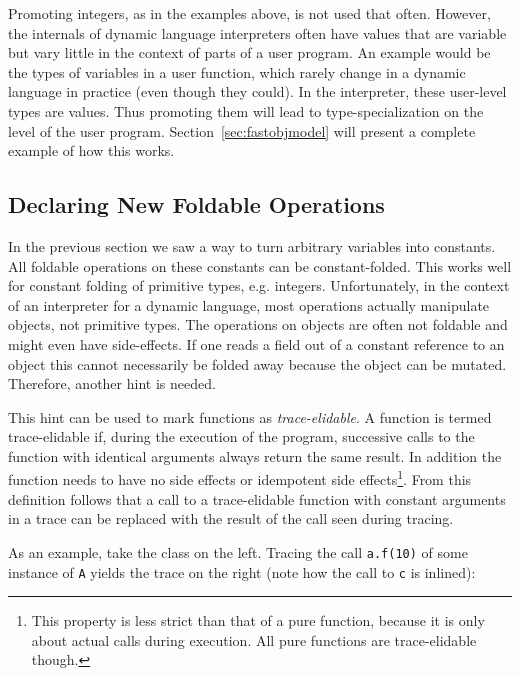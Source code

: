 \documentclass{sigplanconf}
\begin{document}
Promoting integers, as in the examples above, is not used that often.
However, the internals of dynamic language interpreters often
have values that are variable but vary little in the context of parts of a user
program. An example would be the types of variables in a user function, which
rarely change in a dynamic language in practice (even though they could). In the
interpreter, these user-level types are values. Thus promoting them will lead
to type-specialization on the level of the user program.
Section~\ref{sec:fastobjmodel} will present a complete example of how this
works.


\subsection{Declaring New Foldable Operations}

In the previous section we saw a way to turn arbitrary variables into constants. All
foldable operations on these constants can be constant-folded. This works well for
constant folding of primitive types, e.g. integers. Unfortunately, in the context of an
interpreter for a dynamic
language, most operations actually manipulate objects, not primitive types. The
operations on objects are often not foldable and might even have side-effects. If
one reads a field out of a constant reference to an object this cannot
necessarily be folded away because the object can be mutated. Therefore, another
hint is needed.

This hint can be used to mark functions as \emph{trace-elidable}. A function is
termed trace-elidable if, during the execution of the program,
successive calls to the function with identical arguments always return the
same result. In addition the function needs to have no side effects or
idempotent side effects\footnote{This property
is less strict than that of a pure function, because it is only about actual
calls during execution. All pure functions are trace-elidable though.}.
From this definition follows that a call to a trace-elidable function with
constant arguments in a trace can be replaced with the result of the call seen during tracing.

As an example, take the class on the left. Tracing the call \texttt{a.f(10)} of
some instance of \texttt{A} yields the trace on the right (note how the call to
\texttt{c} is inlined):
\end{document}
